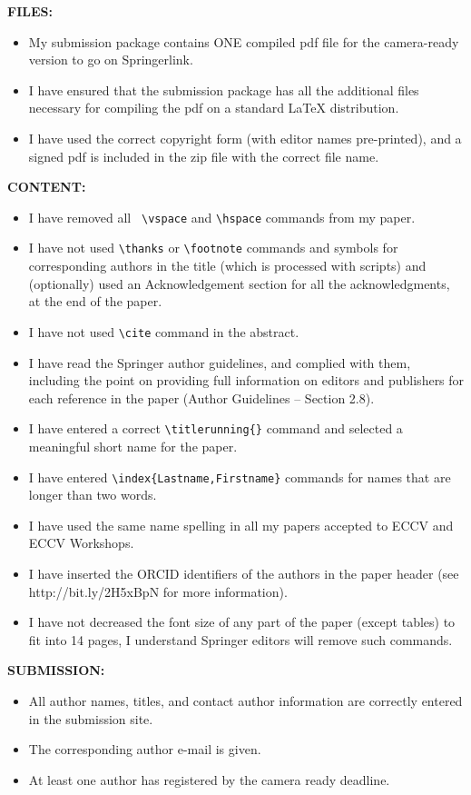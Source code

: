 \documentclass[runningheads]{llncs}
\begin{document}
{\bf FILES:}
\begin{itemize}
    \item My submission package contains ONE compiled pdf file for the camera-ready version to go on Springerlink.
\item I have ensured that the submission package has all the additional files necessary for compiling the pdf on a standard LaTeX distribution.
\item I have used the correct copyright form (with editor names pre-printed), and a signed pdf is included in the zip file with the correct file name.
\end{itemize}

{\bf CONTENT:}
\begin{itemize}
\item I have removed all \verb| \vspace| and \verb|\hspace|  commands from my paper.
\item I have not used \verb|\thanks|  or \verb|\footnote|  commands and symbols for corresponding authors in the title (which is processed with scripts) and (optionally) used an Acknowledgement section for all the acknowledgments, at the end of the paper.
\item I have not used \verb|\cite| command in the abstract.
\item I have read the Springer author guidelines, and complied with them, including the point on providing full information on editors and publishers for each reference in the paper (Author Guidelines – Section 2.8).
\item I have entered a correct \verb|\titlerunning{}| command and selected a meaningful short name for the paper.
\item I have entered \verb|\index{Lastname,Firstname}| commands for names that are longer than two words.
\item I have used the same name spelling in all my papers accepted to ECCV and ECCV Workshops.
\item I have inserted the ORCID identifiers of the authors in the paper header (see http://bit.ly/2H5xBpN for more information).
\item I have not decreased the font size of any part of the paper (except tables) to fit into 14 pages, I understand Springer editors will remove such commands.
\end{itemize}
{\bf SUBMISSION:}
\begin{itemize}
\item All author names, titles, and contact author information are correctly entered in the submission site.
\item The corresponding author e-mail is given.
\item At least one author has registered by the camera ready deadline.
\end{itemize}
\end{document}

